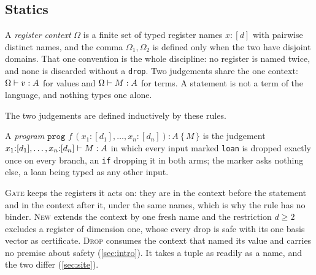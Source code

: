 \documentclass[acmsmall,screen,review,anonymous,nonacm]{acmart}
\begin{document}
\subsection{Statics}\label{sec:lang:statics}

A \emph{register context} $\Omega$ is a finite set of typed register names $x : [d]$
with pairwise distinct names, and the comma $\Omega_1, \Omega_2$ is defined only when
the two have disjoint domains. That one convention is the whole discipline: no
register is named twice, and none is discarded without a \texttt{drop}. Two
judgements share the one context: $\Omega \vdash v : A$ for values and
$\Omega \vdash M : A$ for terms. A statement is not a term of the language, and
nothing types one alone.

\begin{definition}\label{def:language}
The two judgements are defined inductively by these rules.
A \emph{program} $\texttt{prog } f\,(x_1{:}[d_1], \ldots, x_n{:}[d_n]) : A\ \{\,M\,\}$
is the judgement $x_1{:}[d_1], \ldots, x_n{:}[d_n] \vdash M : A$ in which
every input marked \texttt{loan} is dropped exactly once on every branch, an
\texttt{if} dropping it in both arms; the marker asks nothing else, a loan
being typed as any other input.
\end{definition}

\textsc{Gate} keeps the registers it acts on: they are in the context before the
statement and in the context after it, under the same names, which is why the rule
has no binder. \textsc{New} extends the context by one
fresh name and the restriction $d \ge 2$ excludes a register of dimension one,
whose every drop is safe with its one basis vector as certificate.
\textsc{Drop} consumes the context that
named its value and carries no premise about safety (\cref{sec:intro}). It
takes a tuple as readily as a name, and the two differ (\cref{sec:site}).
\end{document}
